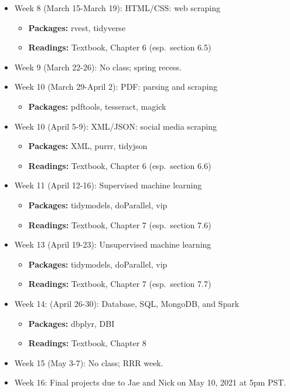 \documentclass[
]{article}
\providecommand{\tightlist}{%
  \setlength{\itemsep}{0pt}\setlength{\parskip}{0pt}}
\begin{document}
\begin{itemize}
\item
  Week 8 (March 15-March 19): HTML/CSS: web scraping

  \begin{itemize}
  \tightlist
  \item
    \textbf{Packages:} rvest, tidyverse
  \item
    \textbf{Readings:} Textbook, Chapter 6 (esp.~section 6.5)
  \end{itemize}
\item
  Week 9 (March 22-26): No class; spring recess.
\item
  Week 10 (March 29-April 2): PDF: parsing and scraping

  \begin{itemize}
  \tightlist
  \item
    \textbf{Packages:} pdftools, tesseract, magick
  \end{itemize}
\item
  Week 10 (April 5-9): XML/JSON: social media scraping

  \begin{itemize}
  \tightlist
  \item
    \textbf{Packages:} XML, purrr, tidyjson
  \item
    \textbf{Readings:} Textbook, Chapter 6 (esp.~section 6.6)
  \end{itemize}
\item
  Week 11 (April 12-16): Supervised machine learning

  \begin{itemize}
  \tightlist
  \item
    \textbf{Packages:} tidymodels, doParallel, vip
  \item
    \textbf{Readings:} Textbook, Chapter 7 (esp.~section 7.6)
  \end{itemize}
\item
  Week 13 (April 19-23): Unsupervised machine learning

  \begin{itemize}
  \tightlist
  \item
    \textbf{Packages:} tidymodels, doParallel, vip
  \item
    \textbf{Readings:} Textbook, Chapter 7 (esp.~section 7.7)
  \end{itemize}
\item
  Week 14: (April 26-30): Database, SQL, MongoDB, and Spark

  \begin{itemize}
  \tightlist
  \item
    \textbf{Packages:} dbplyr, DBI
  \item
    \textbf{Readings:} Textbook, Chapter 8
  \end{itemize}
\item
  Week 15 (May 3-7): No class; RRR week.
\item
  Week 16: Final projects due to Jae and Nick on May 10, 2021 at 5pm
  PST.
\end{itemize}
\end{document}
